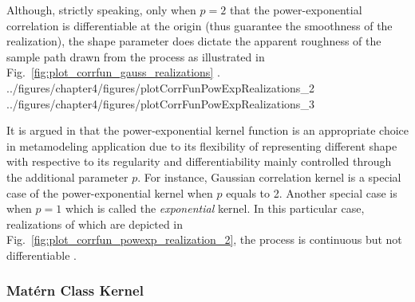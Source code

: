 Although, strictly speaking, only when $p = 2$ that the power-exponential correlation is differentiable at the origin (thus guarantee the smoothness of the realization),
the shape parameter does dictate the apparent roughness of the sample path drawn from the process as illustrated in Fig.~\ref{fig:plot_corrfun_gauss_realizations} \cite{Rasmussen2006}.
{../figures/chapter4/figures/plotCorrFunPowExpRealizations_2}
{../figures/chapter4/figures/plotCorrFunPowExpRealizations_3}

It is argued in \cite{Marrel2008} that the power-exponential kernel function is an appropriate choice in metamodeling application due to its flexibility of representing different shape with respective to its regularity and differentiability mainly controlled through the additional parameter $p$.
For instance, Gaussian correlation kernel is a special case of the power-exponential kernel when $p$ equals to 2. 
Another special case is when $p = 1$ which is called the \emph{exponential} kernel.
In this particular case, realizations of which are depicted in Fig.~\ref{fig:plot_corrfun_powexp_realization_2}, the process is continuous but not differentiable \cite{Rasmussen2006}.

\subsubsection{Mat\'ern Class Kernel}


